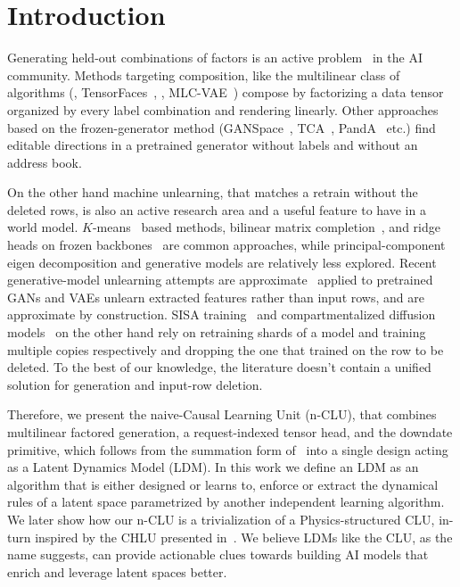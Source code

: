 \documentclass{article} %
\begin{document}
\section{Introduction}
\label{sec:intro}
Generating held-out combinations of factors is an active problem~\citep{du_compositional_2020,avidan_compositional_2022} in the AI community. Methods targeting composition, like the multilinear
class of algorithms (\citealp{tenenbaum_separating_2000},
TensorFaces~\citep{goos_multilinear_2002}, \citealp{vlasic_face_2005}, MLC-VAE~\citep{georgopoulos_multilinear_2020}) compose by factorizing a data tensor organized by every label combination and
rendering linearly. Other approaches based on the frozen-generator method (GANSpace~\citep{harkonen_ganspace_2020}, TCA~\citep{oldfield_tensor_2021}, PandA~\citep{oldfield_panda_2023} etc.) find editable directions in a pretrained generator without labels and without an address book.

On the other hand machine unlearning, that matches a retrain without the deleted rows, is also an active research area and a useful feature to have in a world model. $K$-means~\citep{ginart_making_2019} based methods, bilinear
matrix completion~\citep{xu_netflix_2023}, and ridge heads on frozen backbones~\citep{ceci_exact_2027} are common approaches, while principal-component eigen decomposition and generative models are relatively less explored. Recent generative-model unlearning attempts are approximate~\citep{kong_approximate_2022, kong_data_2023, moon_feature_2024, sun_generative_2025} applied to pretrained GANs and VAEs unlearn extracted features rather than input rows, and
are approximate by construction. SISA training~\citep{bourtoule_machine_2021} and compartmentalized diffusion models~\citep{golatkar_training_2024} on the other hand rely on retraining shards of a model and training multiple copies respectively and dropping the one that trained on the row to be deleted. To the best of our knowledge, the literature doesn't contain a unified solution for generation and input-row deletion.

Therefore, we present the naive-Causal Learning Unit (n-CLU), that combines multilinear factored generation, a request-indexed tensor head, and the downdate primitive, which follows from the summation form of~\citet{cao_towards_2015} into a single design acting as a Latent Dynamics Model (LDM). In this work we define an LDM as an algorithm that is either designed or learns to, enforce or extract the dynamical rules of a latent space parametrized by another independent learning algorithm. We later show how our n-CLU is a trivialization of a Physics-structured CLU, in-turn inspired by the CHLU presented in~\citet{jawahar2026chlu}. We believe LDMs like the CLU, as the name suggests, can provide actionable clues towards building AI models that enrich and leverage latent spaces better.
\end{document}
